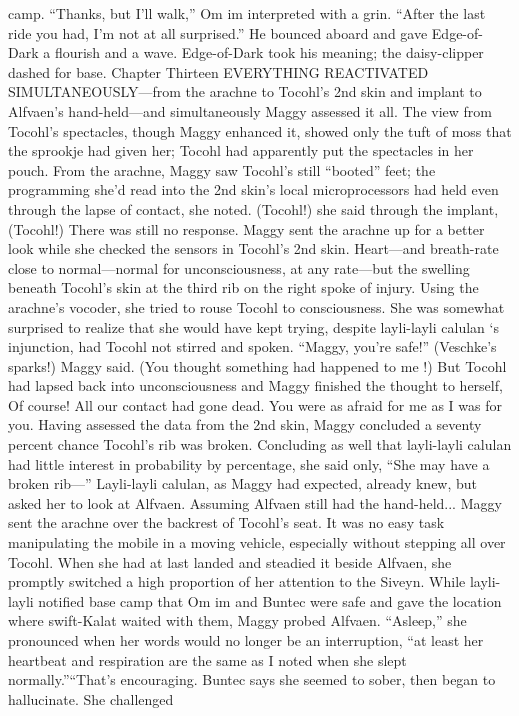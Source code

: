 \documentclass[9pt]{article}
\begin{document}
camp. “Thanks, but I’ll walk,” Om im interpreted with a grin. “After the last ride you had, I’m not at all
surprised.” He bounced aboard and gave Edge-of-Dark a flourish and a wave. Edge-of-Dark took his
meaning; the daisy-clipper dashed for base.
Chapter Thirteen
EVERYTHING REACTIVATED SIMULTANEOUSLY—from the arachne to Tocohl’s 2nd
skin and implant to Alfvaen’s hand-held—and simultaneously Maggy assessed it all. The view from
Tocohl’s spectacles, though Maggy enhanced it, showed only the tuft of moss that the sprookje had
given her; Tocohl had apparently put the spectacles in her pouch. From the arachne, Maggy saw
Tocohl’s still “booted” feet; the programming she’d read into the 2nd skin’s local microprocessors had
held even through the lapse of contact, she noted. (Tocohl!) she said through the implant, (Tocohl!)
There was still no response. Maggy sent the arachne up for a better look while she checked the sensors
in Tocohl’s 2nd skin. Heart—and breath-rate close to normal—normal for unconsciousness, at any
rate—but the swelling beneath Tocohl’s skin at the third rib on the right spoke of injury.
Using the arachne’s vocoder, she tried to rouse Tocohl to consciousness. She was somewhat
surprised to realize that she would have kept trying, despite layli-layli calulan ‘s injunction, had Tocohl
not stirred and spoken. “Maggy, you’re safe!”
(Veschke’s sparks!) Maggy said. (You thought something had happened to me !) But Tocohl had
lapsed back into unconsciousness and Maggy finished the thought to herself, Of course! All our contact
had gone dead. You were as afraid for me as I was for you.
Having assessed the data from the 2nd skin, Maggy concluded a seventy percent chance Tocohl’s
rib was broken. Concluding as well that layli-layli calulan had little interest in probability by percentage,
she said only, “She may have a broken rib—”
Layli-layli calulan, as Maggy had expected, already knew, but asked her to look at Alfvaen.
Assuming Alfvaen still had the hand-held... Maggy sent the arachne over the backrest of Tocohl’s seat.
It was no easy task manipulating the mobile in a moving vehicle, especially without stepping all over
Tocohl. When she had at last landed and steadied it beside Alfvaen, she promptly switched a high
proportion of her attention to the Siveyn.
While layli-layli notified base camp that Om im and Buntec were safe and gave the location where
swift-Kalat waited with them, Maggy probed Alfvaen. “Asleep,” she pronounced when her words would
no longer be an interruption, “at least her heartbeat and respiration are the same as I noted when she
slept normally.”“That’s encouraging. Buntec says she seemed to sober, then began to hallucinate. She challenged
\end{document}
